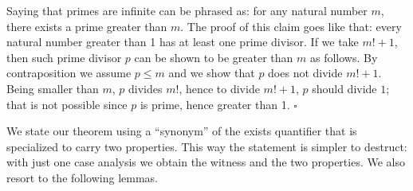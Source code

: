 Saying that primes are infinite can be phrased as: for any natural number
$m$, there exists a prime greater than $m$.  The proof of this claim goes like
that: every natural number greater than 1 has at least one prime divisor.  If
we take $m! + 1$, then such prime divisor $p$ can be shown to be greater than $m$ as
follows.  By contraposition we assume $p \leq m$ and we show that $p$
does not divide $m!+1$.
Being smaller than $m$, $p$ divides $m!$, hence to divide $m!+1$, $p$ should divide
$1$; that is not possible since $p$ is prime, hence greater than 1.
\hfill$\square$



% 
% 
% 
% 
% 
% 

We state our theorem using a
``synonym'' of the exists quantifier that is specialized to carry two
properties.  This way the statement is simpler to destruct: with just one
case analysis we obtain the witness and the two properties.
We also resort to the following lemmas.

